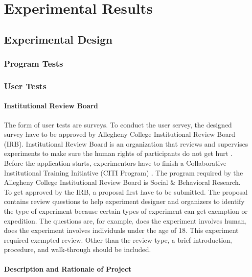 \chapter{Experimental Results}
\label{ch:experiments}


\section{Experimental Design}

\subsection{Program Tests}



\subsection{User Tests}

\subsubsection{Institutional Review Board}

The form of user tests are surveys. To conduct the user servey, the designed survey
have to be approved by Allegheny College Institutional Review Board (IRB). Institutional
Review Board is an organization that reviews and supervises experiments to make
sure the human rights of participants do not get hurt \cite{irb}. Before the application
starts, experimentors have to finish a Collaborative Institutional Training Initiative
(CITI Program) \cite{citi}. The program required by the Allegheny College Institutional
Review Board is Social & Behavioral Research. To get approved by the IRB, a proposal
first have to be submitted. The proposal contains review questions to help experiment
designer and organizers to identify the type of experiment because certain types
of experiment can get exemption or expedition. The questions are, for example,
does the experiment involves human, does the experiment involves individuals under
the age of 18. This experiment required exempted review. Other than the review
type, a brief introduction, procedure, and walk-through should be included.

\subsubsection{Description and Rationale of Project}

